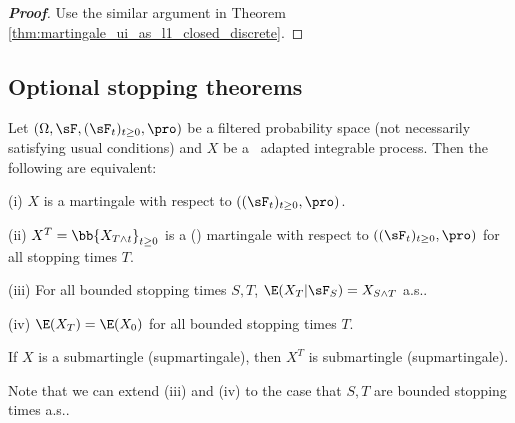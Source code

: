 \begin{proof}[\bf Proof]
Use the similar argument in Theorem \ref{thm:martingale_ui_as_l1_closed_discrete}.
\end{proof}

\subsection{Optional stopping theorems}

\begin{theorem}\label{thm:optional_stopping_bounded_stopping_time_continuous}
Let $(\Omega,\sF,(\sF_t)_{t\geq 0}, \pro)$ be a filtered probability space (not necessarily satisfying usual conditions) and $X$ be a \cadlag\ adapted integrable process. Then the following are equivalent:
\ben
\item [(i)] $X$ is a martingale with respect to $((\sF_t)_{t\geq 0},\pro)$.
\item [(ii)] $X^T = \bb{X_{T\land t}}_{t\geq 0}$ is a (\cadlag) martingale with respect to $((\sF_t)_{t\geq 0},\pro)$ for all stopping times $T$.%
\item [(iii)] For all bounded stopping times $S,T$, $\E(X_T|\sF_S) = X_{S\land T}$ a.s..
\item [(iv)] $\E(X_T) = \E(X_0)$ for all bounded stopping times $T$.
\een
\end{theorem}

\begin{remark}
If $X$ is a submartingle (supmartingale), then $X^T$ is submartingle (supmartingale).

Note that we can extend (iii) and (iv) to the case that $S,T$ are bounded stopping times a.s..
\end{remark}


